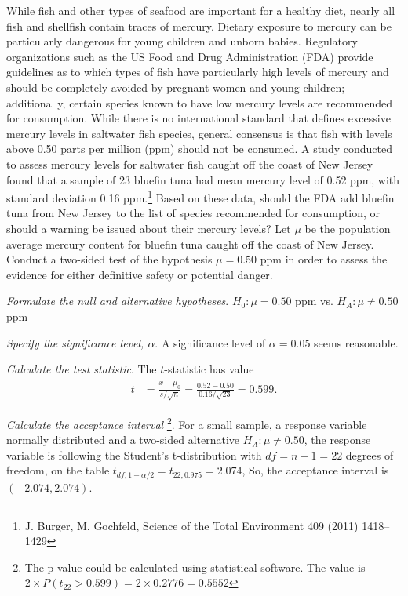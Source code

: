 \begin{examplewrap}
\begin{nexample}{While fish and other types of seafood are important for a healthy diet, nearly all fish and shellfish contain traces of mercury. Dietary exposure to mercury can be particularly dangerous for young children and unborn babies. Regulatory organizations such as the US Food and Drug Administration (FDA) provide guidelines as to which types of fish have particularly high levels of mercury and should be completely avoided by pregnant women and young children; additionally, certain species known to have low mercury levels are recommended for consumption. While there is no international standard that defines excessive mercury levels in saltwater fish species, general consensus is that fish with levels above 0.50 parts per million (ppm) should not be consumed. A study conducted to assess mercury levels for saltwater fish caught off the coast of New Jersey found that a sample of 23 bluefin tuna had mean mercury level of 0.52 ppm, with standard deviation 0.16 ppm.\footnote{J. Burger, M. Gochfeld, Science of the Total Environment 409 (2011) 1418–1429} Based on these data, should the FDA add bluefin tuna from New Jersey to the list of species recommended for consumption, or should a warning be issued about their mercury levels?}\label{hypTestTuna}%
Let $\mu$ be the population average mercury content for bluefin tuna caught off the coast of New Jersey. Conduct a two-sided test of the hypothesis $\mu = 0.50$ ppm in order to assess the evidence for either definitive safety or potential danger.

\textit{Formulate the null and alternative hypotheses}. $H_0: \mu = 0.50$ ppm vs. $H_A: \mu \neq 0.50$ ppm

\textit{Specify the significance level, $\alpha$}.  A significance level of $\alpha = 0.05$ seems reasonable. 

\textit{Calculate the test statistic}. The  $t$-statistic has value
\begin{align*}
t &= \frac{\overline{x}-\mu_0}{s/\sqrt{n}} = \frac{0.52 - 0.50} {0.16/\sqrt{23}} = 0.599.
\end{align*}

\textit{Calculate the acceptance interval} \footnote{The p-value could be calculated using statistical software. The value is $2\times P(t_{22}>0.599)=2\times 0.2776=0.5552$}. For a small sample, a response variable normally distributed and a two-sided alternative $H_A: \mu \neq 0.50$, the response variable is following the Student's t-distribution with $df=n-1=22$ degrees of freedom, on the table $t_{df,1-\alpha/2}=t_{22,0.975}=2.074$, So, the acceptance interval is  $(-2.074,2.074)$.


\end{nexample}
\end{examplewrap}
